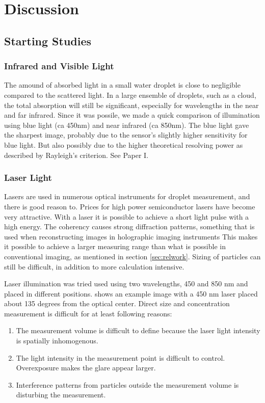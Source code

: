 
\chapter{Discussion}
\label{chap:discussion}

\section{Starting Studies}
\label{sec:discussionstarting}

\subsection{Infrared and Visible Light}

The amound of absorbed light in a small water droplet is close to negligible compared to the scattered light. In a large ensemble of droplets, such as a cloud, the total absorption will still be significant, especially for wavelengths in the near and far infrared. Since it was possile, we made a quick comparison of illumination using blue light (ca 450nm) and near infrared (ca 850nm). The blue light gave the sharpest image, probably due to the sensor's slightly higher sensitivity for blue light. But also possibly due to the higher theoretical resolving power as described by Rayleigh's criterion. See Paper I.

\subsection{Laser Light}
\label{sec:discussionlaser}

Lasers are used in numerous optical instruments for droplet measurement, and there is good reason to. Prices for high power semiconductor lasers have become very attractive. With a laser it is possible to achieve a short light pulse with a high energy. The coherency causes strong diffraction patterns, something that is used when reconstructing images in holographic imaging instruments This makes it possible to achieve a larger measuring range than what is possible in conventional imaging, as mentioned in section \ref{sec:relwork}. Sizing of particles can still be difficult, in addition to more calculation intensive. 
 
Laser illumination was tried used using two wavelengths, 450 and 850 nm and placed in different positions.  shows an example image with a 450 nm laser placed about 135 degrees from the optical center. Direct size and concentration measurement is difficult for at least following reasons: 
\begin{enumerate}
\item The measurement volume is difficult to define because the laser light intensity is spatially inhomogenous.
\item The light intensity in the measurement point is difficult to control. Overexposure makes the glare appear larger.
\item Interference patterns from particles outside the measurement volume is disturbing the measurement.
\end{enumerate}


